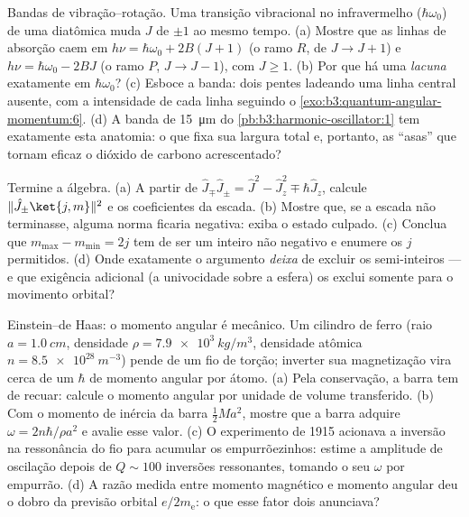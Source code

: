 \begin{exercise}[$\star\star\star$]\label{exo:b3:quantum-angular-momentum:10}
Bandas de vibração--rotação. Uma transição vibracional no infravermelho
($\hbar\omega_0$) de uma diatômica muda $J$ de $\pm1$ ao mesmo tempo.
(a) Mostre que as linhas de absorção caem em $h\nu =
\hbar\omega_0 + 2B(J+1)$ (o ramo $R$, de $J \to J+1$) e
$h\nu = \hbar\omega_0 - 2BJ$ (o ramo $P$, $J \to J-1$), com $J \ge
1$. (b) Por que há uma \emph{lacuna} exatamente em $\hbar\omega_0$? (c)
Esboce a banda: dois pentes ladeando uma linha central ausente, com a
intensidade de cada linha seguindo o
\cref{exo:b3:quantum-angular-momentum:6}. (d) A banda de
\qty{15}{\micro m} do \cref{pb:b3:harmonic-oscillator:1} tem
exatamente esta anatomia: o que fixa sua largura total e, portanto, as
``asas'' que tornam eficaz o dióxido de carbono acrescentado?
\end{exercise}

\begin{exercise}[$\star\star\star$]\label{exo:b3:quantum-angular-momentum:11}
Termine a álgebra. (a) A partir de $\hat J_\mp\hat J_\pm = \hat J^2 -
\hat J_z^2 \mp \hbar\hat J_z$, calcule $\|\hat J_\pm\ket{j,m}\|^2$ e os
coeficientes da escada. (b) Mostre que, se a escada não terminasse,
alguma norma ficaria negativa: exiba o estado culpado. (c) Conclua que
$m_{\max} - m_{\min} = 2j$ tem de ser um inteiro não negativo e
enumere os $j$ permitidos. (d) Onde exatamente o argumento \emph{deixa}
de excluir os semi-inteiros --- e que exigência adicional (a
univocidade sobre a esfera) os exclui somente para o movimento orbital?
\end{exercise}

\begin{exercise}[$\star\star\star$]\label{exo:b3:quantum-angular-momentum:12}
Einstein--de Haas: o momento angular é mecânico. Um cilindro de ferro
(raio $a = \qty{1.0}{cm}$, densidade $\rho = \qty{7.9e3}{kg/m^3}$,
densidade atômica $n = \qty{8.5e28}{m^{-3}}$) pende de um fio de
torção; inverter sua magnetização vira cerca de um $\hbar$ de momento
angular por átomo. (a) Pela conservação, a barra tem de recuar: calcule
o momento angular por unidade de volume transferido. (b) Com o momento de inércia da barra $\tfrac12 M
a^2$, mostre que a barra adquire $\omega = 2n\hbar/\rho a^2$ e avalie
esse valor. (c) O experimento de 1915 acionava a inversão na
ressonância do fio para acumular os empurrõezinhos: estime a amplitude
de oscilação depois de $Q \sim 100$ inversões ressonantes, tomando o
seu $\omega$ por empurrão. (d) A razão medida entre momento magnético e
momento angular deu o dobro da previsão orbital $e/2m_{\text{e}}$: o
que esse fator dois anunciava?
\end{exercise}

